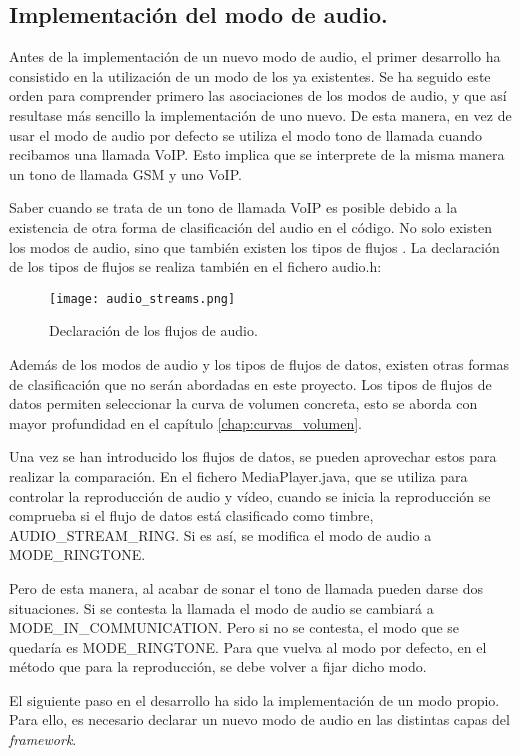 \subsection{Implementación del modo de audio.}
Antes de la implementación de un nuevo modo de audio, el primer desarrollo ha consistido en la utilización de un modo de los ya existentes. Se ha seguido este orden para comprender primero las asociaciones de los modos de audio, y que así resultase más sencillo la implementación de uno nuevo. De esta manera, en vez de usar el modo de audio por defecto se utiliza el modo tono de llamada cuando recibamos una llamada \gls{VoIP}. Esto implica que se interprete de la misma manera un tono de llamada \gls{GSM} y uno \gls{VoIP}.

Saber cuando se trata de un tono de llamada \gls{VoIP} es posible debido a la existencia de otra forma de clasificación del audio en el código. No solo existen los modos de audio, sino que también existen los tipos de flujos \cite{audio_manager}. La declaración de los tipos de flujos se realiza también en el fichero audio.h:

\begin{figure}[H]
	\centering
	\texttt{[image: audio\_streams.png]}
	\caption{Declaración de los flujos de audio.}
	\label{fig:audio_streams}
\end{figure}

Además de los modos de audio y los tipos de flujos de datos, existen otras formas de clasificación que no serán abordadas en este proyecto. Los tipos de flujos de datos permiten seleccionar la curva de volumen concreta, esto se aborda con mayor profundidad en el capítulo \ref{chap:curvas_volumen}.

Una vez se han introducido los flujos de datos, se pueden aprovechar estos para realizar la comparación.  En el fichero MediaPlayer.java, que se utiliza para controlar la reproducción de audio y vídeo, cuando se inicia la reproducción se comprueba si el flujo de datos está clasificado como timbre, AUDIO\_STREAM\_RING. Si es así, se modifica el modo de audio a MODE\_RINGTONE.

Pero de esta manera, al acabar de sonar el tono de llamada pueden darse dos situaciones. Si se contesta la llamada el modo de audio se cambiará a MODE\_IN\_COMMUNICATION. Pero si no se contesta, el modo que se quedaría es MODE\_RINGTONE. Para que vuelva al modo por defecto, en el método que para la reproducción, se debe volver a fijar dicho modo.

El siguiente paso en el desarrollo ha sido la implementación de un modo propio. Para ello, es necesario declarar un nuevo modo de audio en las distintas capas del \textit{framework}.


